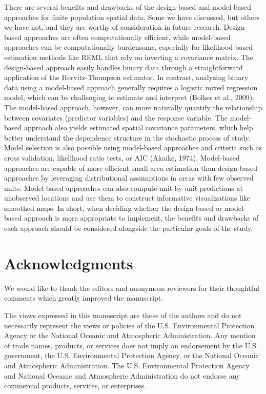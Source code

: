 \documentclass[]{elsarticle} %
\begin{document}
There are several benefits and drawbacks of the design-based and
model-based approaches for finite population spatial data. Some we have
discussed, but others we have not, and they are worthy of consideration
in future research. Design-based approaches are often computationally
efficient, while model-based approaches can be computationally
burdensome, especially for likelihood-based estimation methods like REML
that rely on inverting a covariance matrix. The design-based approach
easily handles binary data through a straightforward application of the
Horvitz-Thompson estimator. In contrast, analyzing binary data using a
model-based approach generally requires a logistic mixed regression
model, which can be challenging to estimate and interpret (Bolker et
al., 2009). The model-based approach, however, can more naturally
quantify the relationship between covariates (predictor variables) and
the response variable. The model-based approach also yields estimated
spatial covariance parameters, which help better understand the
dependence structure in the stochastic process of study. Model selection
is also possible using model-based approaches and criteria such as cross
validation, likelihood ratio tests, or AIC (Akaike, 1974). Model-based
approaches are capable of more efficient small-area estimation than
design-based approaches by leveraging distributional assumptions in
areas with few observed units. Model-based approaches can also compute
unit-by-unit predictions at unobserved locations and use them to
construct informative visualizations like smoothed maps. In short, when
deciding whether the design-based or model-based approach is more
appropriate to implement, the benefits and drawbacks of each approach
should be considered alongside the particular goals of the study.

\hypertarget{acknowledgments}{%
\section*{Acknowledgments}\label{acknowledgments}}

We would like to thank the editors and anonymous reviewers for their
thoughtful comments which greatly improved the manuscript.

The views expressed in this manuscript are those of the authors and do
not necessarily represent the views or policies of the U.S.
Environmental Protection Agency or the National Oceanic and Atmospheric
Administration. Any mention of trade names, products, or services does
not imply an endorsement by the U.S. government, the U.S. Environmental
Protection Agency, or the National Oceanic and Atmospheric
Administration. The U.S. Environmental Protection Agency and National
Oceanic and Atmospheric Administration do not endorse any commercial
products, services, or enterprises.
\end{document}
